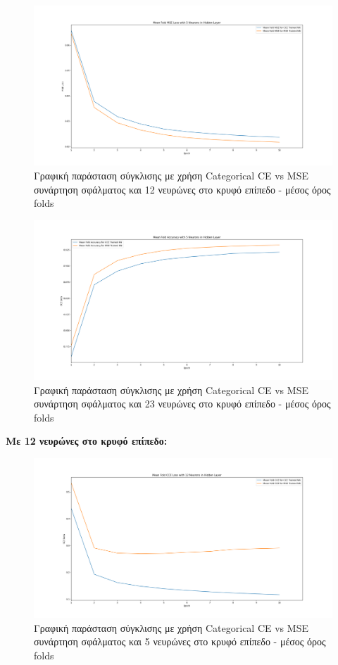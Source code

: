 \documentclass[12pt,a4paper]{article}
\begin{document}
\begin{figure}[H]
	\includegraphics[width=\textwidth]{Screenshots/11. CCE vs MSE - MSE Loss - 5 Neurons - Mean.png}
	\caption{Γραφική παράσταση σύγκλισης με χρήση Categorical CE vs MSE συνάρτηση σφάλματος και 12 νευρώνες στο κρυφό επίπεδο - μέσος όρος folds}
\end{figure}

\begin{figure}[H]
	\includegraphics[width=\textwidth]{Screenshots/12. CCE vs MSE - Accuracy - 5 Neurons - Mean.png}
	\caption{Γραφική παράσταση σύγκλισης με χρήση Categorical CE vs MSE συνάρτηση σφάλματος και 23 νευρώνες στο κρυφό επίπεδο - μέσος όρος folds}
\end{figure}

\textbf{Με 12 νευρώνες στο κρυφό επίπεδο:}

\begin{figure}[H]
	\includegraphics[width=\textwidth]{Screenshots/13. CCE vs MSE - CCE Loss - 12 Neurons - Mean.png}
	\caption{Γραφική παράσταση σύγκλισης με χρήση Categorical CE vs MSE συνάρτηση σφάλματος και 5 νευρώνες στο κρυφό επίπεδο - μέσος όρος folds}
\end{figure}
\end{document}
